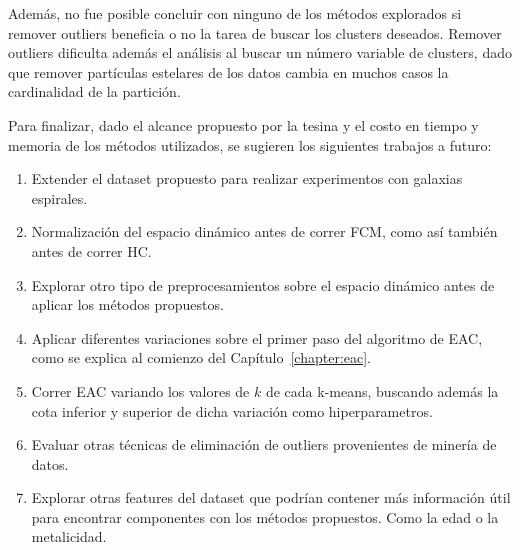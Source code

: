 Además, no fue posible concluir con ninguno de los métodos explorados si remover outliers beneficia o no la tarea de buscar los clusters deseados. Remover outliers dificulta además el análisis al buscar un número variable de clusters, dado que remover partículas estelares de los datos cambia en muchos casos la cardinalidad de la partición.

Para finalizar, dado el alcance propuesto por la tesina y el costo en tiempo y memoria de los métodos utilizados, se sugieren los siguientes trabajos a futuro:

\begin{enumerate}
\item Extender el dataset propuesto para realizar experimentos con galaxias espirales.
\item Normalización del espacio dinámico antes de correr \gls{FCM}, como así también antes de correr \gls{HC}. 
\item Explorar otro tipo de preprocesamientos sobre el espacio dinámico antes de aplicar los métodos propuestos.
\item Aplicar diferentes variaciones sobre el primer paso del algoritmo de \gls{EAC}, como se explica al comienzo del Capítulo~\ref{chapter:eac}.
\item Correr \gls{EAC} variando los valores de $k$ de cada k-means, buscando además la cota inferior y superior de dicha variación como hiperparametros.
\item Evaluar otras técnicas de eliminación de outliers provenientes de minería de datos.
\item Explorar otras features del dataset que podrían contener más información útil para encontrar componentes con los métodos propuestos. Como la edad o la metalicidad.
\end{enumerate}
